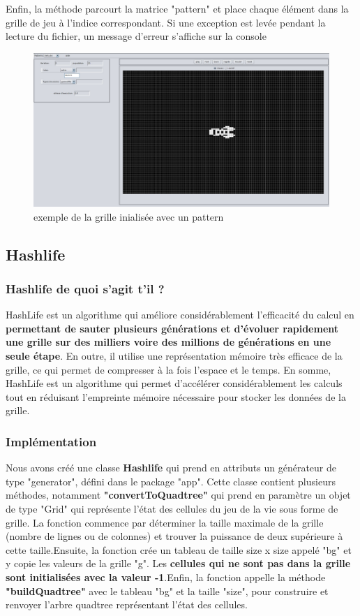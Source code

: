 Enfin, la méthode parcourt la matrice "pattern" et place chaque élément dans la grille de jeu à l'indice correspondant. Si une exception est levée pendant la lecture du fichier, un message d'erreur s'affiche sur la console
\begin{figure}[h]
		\centering
      \raggedright  
		\includegraphics[width=13cm]{images/image1.jpeg}
	    \caption{exemple de la grille inialisée avec un pattern }
\end{figure}
\newpage
\subsection{Hashlife}
\subsubsection{Hashlife de quoi s'agit t'il ?}

HashLife est un algorithme qui améliore considérablement l'efficacité du calcul en \textbf{permettant de sauter plusieurs générations et d'évoluer rapidement une grille sur des milliers voire des millions de générations en une seule étape}. En outre, il utilise une représentation mémoire très efficace de la grille, ce qui permet de compresser à la fois l'espace et le temps. En somme, HashLife est un algorithme qui permet d'accélérer considérablement les calculs tout en réduisant l'empreinte mémoire nécessaire pour stocker les données de la grille.
\subsubsection{Implémentation}

 
Nous avons créé une classe \textbf{Hashlife} qui prend en attributs un générateur de type "generator", défini dans le package "app". Cette classe contient plusieurs méthodes, notamment \textbf{"convertToQuadtree"} qui prend en paramètre un objet de type "Grid" qui représente l'état des cellules du jeu de la vie sous forme de grille. La fonction commence par déterminer la taille maximale de la grille (nombre de lignes ou de colonnes) et trouver la puissance de deux supérieure à cette taille.Ensuite, la fonction crée un tableau de taille size x size appelé "bg" et y copie les valeurs de la grille "g". Les \textbf{cellules qui ne sont pas dans la grille sont initialisées avec la valeur -1}.Enfin, la fonction appelle la méthode \textbf{"buildQuadtree"} avec le tableau "bg" et la taille "size", pour construire et renvoyer l'arbre quadtree représentant l'état des cellules.\newline

